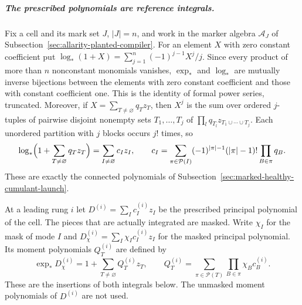 \subparagraph{The prescribed polynomials are reference integrals.}
Fix a cell and its mark set $J$, $|J|=n$, and work in the marker algebra
$\mathscr A_J$ of Subsection~\ref{sec:allarity-planted-compiler}. For an
element $X$ with zero constant coefficient put
$\log_*(1+X)=\sum_{j=1}^n(-1)^{j-1}X^j/j$. Since every product of more
than $n$ nonconstant monomials vanishes, $\exp_*$ and $\log_*$ are mutually
inverse bijections between the elements with zero constant coefficient
and those with constant coefficient one. This is the identity of formal
power series, truncated. Moreover, if $X=\sum_{T\ne\varnothing}q_Tz_T$,
then $X^j$ is the sum over ordered $j$-tuples of pairwise disjoint nonempty
sets $T_1,\ldots,T_j$ of $\prod_lq_{T_l}z_{T_1\cup\cdots\cup T_j}$. Each
unordered partition with $j$ blocks occurs $j!$ times, so
\begin{equation}\label{eq:allarity-moment-cumulant}
 \log_*\Bigl(1+\sum_{T\ne\varnothing}q_Tz_T\Bigr)
  =\sum_{I\ne\varnothing}c_Iz_I,\qquad
 c_I=\sum_{\pi\in\mathcal P(I)}(-1)^{|\pi|-1}(|\pi|-1)!\prod_{B\in\pi}q_B .
\end{equation}
These are exactly the connected polynomials of
Subsection~\ref{sec:marked-healthy-cumulant-launch}.

At a leading rung $i$ let $D^{(i)}=\sum_Ic^{(i)}_Iz_I$ be the prescribed
principal polynomial of the cell. The pieces that are actually integrated
are masked. Write $\chi_I$ for the mask of mode $I$ and
$D^{(i)}_\chi=\sum_I\chi_Ic^{(i)}_Iz_I$ for the masked principal
polynomial. Its moment polynomials $Q^{(i)}_T$ are defined by
\[
 \exp_*D^{(i)}_\chi=1+\sum_{T\ne\varnothing}Q^{(i)}_Tz_T,\qquad
 Q^{(i)}_T=\sum_{\pi\in\mathcal P(T)}\prod_{B\in\pi}\chi_Bc^{(i)}_B .
\]
These are the insertions of both integrals below. The unmasked moment
polynomials of $D^{(i)}$ are not used.

